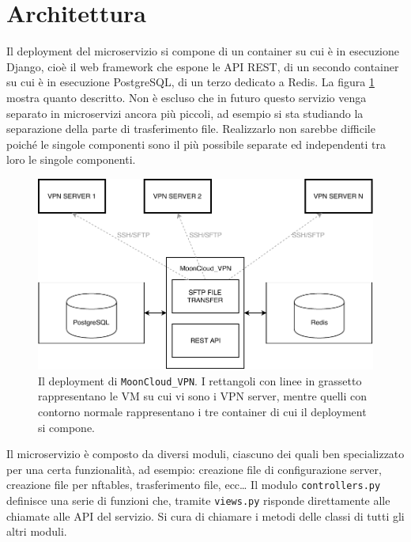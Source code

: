 \section{Architettura}
Il deployment del microservizio si compone di un container
su cui è in esecuzione Django, cioè il web framework che espone le API REST,
di un secondo container su cui è in esecuzione PostgreSQL, di un terzo dedicato
a Redis.
La figura \ref{fig:microservice-deployment} mostra quanto descritto.
Non è escluso che in futuro questo servizio venga separato in microservizi
ancora più piccoli, ad esempio si sta studiando la separazione della
parte di trasferimento file. Realizzarlo non sarebbe
difficile poiché le singole componenti sono il più possibile separate ed independenti
tra loro le singole componenti.

\begin{figure}
	\includegraphics[scale=0.5]{img/microservice_deployment}
	\caption[Il deployment di \texttt{MoonCloud\_VPN}]{
		Il deployment di \texttt{MoonCloud\_VPN}. I rettangoli con linee in grassetto
		rappresentano le VM su cui vi sono i VPN server, mentre quelli con contorno
		normale rappresentano i tre container di cui il deployment si compone.
	}
	\label{fig:microservice-deployment}
\end{figure}


Il microservizio è composto da diversi moduli, ciascuno dei quali ben
specializzato per una certa funzionalità, ad esempio: creazione file di configurazione
server, creazione file per nftables, trasferimento file, ecc\ldots
Il modulo \texttt{controllers.py}  definisce
una serie di funzioni che, tramite \texttt{views.py} risponde direttamente alle
chiamate alle API del servizio. Si cura di chiamare i metodi delle classi di tutti
gli altri moduli.

